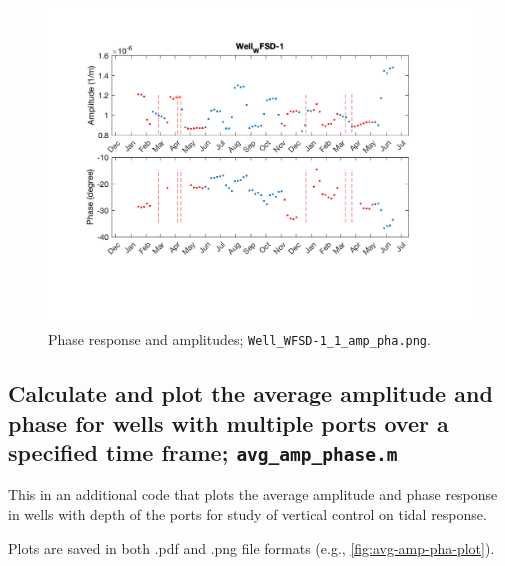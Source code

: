 \documentclass[11pt]{article}
\begin{document}
\begin{figure}[h]
    \centering
    \includegraphics[width=1.0\textwidth]{../Well_WFSD-1_1_amp_pha.png}
    \caption{Phase response and amplitudes; \texttt{Well\_WFSD-1\_1\_amp\_pha.png}.}
    \label{fig:amp-pha-plot}
\end{figure}


\subsection{Calculate and plot the average amplitude and phase for wells with
multiple ports over a specified time frame; \texttt{avg\_amp\_phase.m}}

This in an additional code that plots the average amplitude and phase response
in wells with depth of the ports for study of vertical control on tidal
response.
 
Plots are saved in both .pdf and .png file formats (e.g., \autoref{fig:avg-amp-pha-plot}).
\end{document}
